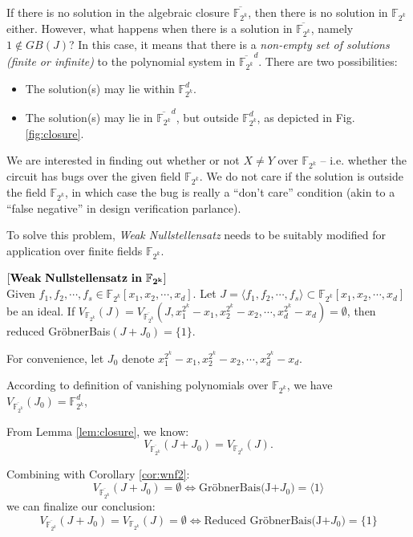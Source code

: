 If there is no solution in the algebraic closure $\overline{ \mathbb{F}_{2^k}}$, 
then there is no solution in $\mathbb{F}_{2^k}$ either. However, what
happens when there is a solution in $\overline{ \mathbb{F}_{2^k}}$, namely $1 \notin GB(J)$? 
In this case, it means that there is a
{\it non-empty set of  solutions (finite or infinite)} to the
polynomial system in $\overline{\mathbb{F}_{2^k}}^d$. There are two possibilities: 
\begin{itemize}
	\item The solution(s) may lie within $\mathbb{F}_{2^k}^d$.
	\item The solution(s) may lie in $\overline {\mathbb{F}_{2^k}}^d$, but outside $\mathbb{F}_{2^k}^d$, as depicted in  Fig. \ref{fig:closure}.
\end{itemize}
We are interested in finding out whether or not $X \neq Y$ over $\mathbb{F}_{2^{k}}$ 
-- i.e. whether the circuit has bugs over the given field $\mathbb{F}_{2^{k}}$. We do not care if the
solution is outside the field $\mathbb{F}_{2^{k}}$, in which case the bug is really a
``don't care'' condition (akin to a ``false negative'' in design verification parlance). 



To solve this problem, {\it Weak Nullstellensatz} needs to be suitably modified for application over finite fields $\mathbb{F}_{2^{k}}$.
\begin{Theorem}\label{wnull:ff}
$[\bf{Weak~Nullstellensatz~in~\mathbb{F}_{2^k}}]$\\
Given $f_1,f_2,\cdots,f_s \in \mathbb{F}_{2^k}[x_1,x_2,\cdots,x_d]$. 
Let $J=\langle f_1,f_2,\cdots,f_s\rangle \subset \mathbb{F}_{2^k}[x_1, x_2, \cdots, x_d]$ be an ideal. 
If $V_{\mathbb{F}_{2^k}}(J)=V_{\overline {\mathbb{F}_{2^k}}}(J,x_1^{2^k}-x_1,x_2^{2^k}-x_2,\cdots,x_d^{2^k}-x_d)=\emptyset$, 
then reduced Gr\"obnerBais$(J+J_{0})=\{1\}$.
\end{Theorem}
 
\begin{Proof}
For convenience, let $J_0$ denote $x_1^{2^k}-x_1,x_2^{2^k}-x_2,\cdots,x_d^{2^k}-x_d$.

According to definition of vanishing polynomials over $\mathbb{F}_{2^k}$, we have
$V_{\overline {\mathbb{F}_{2^k}}}(J_0)={\mathbb{F}_{2^k}^d}$, 

From Lemma \ref{lem:closure}, we know:
\begin{equation}
	V_{\overline {\mathbb{F}_{2^k}}}(J+J_0)=V_{\mathbb{F}_{2^k}}(J). 
\end{equation}

Combining with Corollary \ref{cor:wnf2}: 
\begin{equation}
V_{\overline {\mathbb{F}_{2^k}}}(J+J_0)=\emptyset \Leftrightarrow \text{Gr\"obnerBais(J+$J_0$)} =\langle 1\rangle 
\end{equation}
we can finalize our conclusion:
\begin{equation}
V_{\overline {\mathbb{F}_{2^k}}}(J+J_0)=V_{\mathbb{F}_{2^k}}(J)=\emptyset \Leftrightarrow {\text{Reduced Gr\"obnerBais(J+$J_{0}$)}}=\{ 1\}  \nonumber
\end{equation}
{}
\end{Proof}

